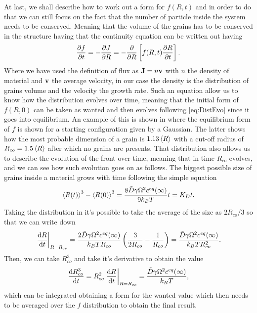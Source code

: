 At last, we shall describe how to work out a form for $f(R, t)$ and in order to do that we can still focus on the fact that the number of particle inside the system needs to be conserved. Meaning that the volume of the grains has to be conserved in the structure having that the continuity equation can be written out having
\begin{equation}
    \label{eq:DistEvo}
    \pdv{f}{t} = -\pdv{J}{R} = -\pdv{}{R}\left[ f(R,t)\pdv{R}{t} \right].
\end{equation}
Where we have used the definition of flux as $\vb{J} = n\vb{v}$ with $n$ the density of material and $\vb{v}$ the average velocity, in our case the density is the distribution of grains volume and the velocity the growth rate. Such an equation allow us to know how the distribution evolves over time, meaning that the initial form of $f(R, 0)$ can be taken as wanted and then evolves following \eqref{eq:DistEvo} since it goes into equilibrium. An example of this is shown in  where the equilibrium form of $f$ is shown for a starting configuration given by a Gaussian. The latter shows how the most probable dimension of a grain is $1.13\left\langle R \right\rangle$ with a cut-off radius of $R_{co} = 1.5\left\langle R \right\rangle$ after which no grains are presents. That distribution also allows us to describe the evolution of the front over time, meaning that in time $R_{co}$ evolves, and we can see how such evolution goes on as follows.
{
    The biggest possible size of grains inside a material grows with time following the simple equation
    \begin{equation}
        \label{eq:cutoffGrowth}
        \left\langle R(t) \right\rangle^3 - \left\langle R(0) \right\rangle^3 = \frac{8\tilde{D}\gamma\Omega^2c^{eq}(\infty)}{9k_BT}t = K_Dt.
    \end{equation}
}
{
    Taking the distribution in  it's possible to take the average of the size as $2R_{co}/3$ so that we can write down
    \begin{equation}
        \eval{\dv{R}{t}}_{R=R_{co}} = \frac{2\tilde{D}\gamma\Omega^2c^{eq}(\infty)}{k_BTR_{co}}\left( \frac{3}{2R_{co}} - \frac{1}{R_{co}} \right) = \frac{\tilde{D}\gamma\Omega^2c^{eq}(\infty)}{k_BTR_{co}^2}.
    \end{equation}
    Then, we can take $R_{co}^3$ and take it's derivative to obtain the value
    \begin{equation}
        \dv{R_{co}^3}{t} = R^2_{co} \eval{\dv{R}{t}}_{R=R_{co}} = \frac{\tilde{D}\gamma\Omega^2c^{eq}(\infty)}{k_BT},
    \end{equation} 
    which can be integrated obtaining a form for the wanted value which then needs to be averaged over the $f$ distribution to obtain the final result.
}
